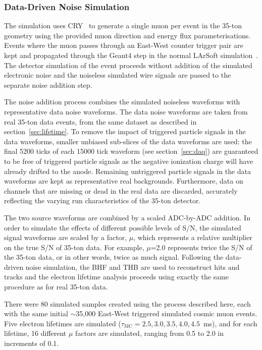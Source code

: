 \documentclass[10pt,a4paper]{article}
\begin{document}
\subsubsection{Data-Driven Noise Simulation}\label{sec:datadrivennoise}

The simulation uses CRY~\cite{CRY} to generate a single muon per event in the 35-ton geometry using the provided muon direction and energy flux parameterisations. Events where the muon passes through an East-West counter trigger pair are kept and propagated through the Geant4 step in the normal LArSoft simulation~\cite{larsoft}. The detector simulation of the event proceeds without addition of the simulated electronic noise and the noiseless simulated wire signals are passed to the separate noise addition step.

The noise addition process combines the simulated noiseless waveforms with representative data noise waveforms. The data noise waveforms are taken from real 35-ton data events, from the same dataset as described in section~\ref{sec:lifetime}. To remove the impact of triggered particle signals in the data waveforms, smaller unbiased sub-slices of the data waveforms are used: the final 5200 ticks of each 15000 tick waveform (see section~\ref{sec:daq}) are guaranteed to be free of triggered particle signals as the negative ionization charge will have already drifted to the anode. Remaining untriggered particle signals in the data waveforms are kept as representative real backgrounds. Furthermore, data on channels that are missing or dead in the real data are discarded, accurately reflecting the varying run characteristics of the 35-ton detector.

The two source waveforms are combined by a scaled ADC-by-ADC addition. In order to simulate the effects of different possible levels of S/N, the simulated signal waveforms are scaled by a factor, $\mu$, which represents a relative multiplier on the true S/N of 35-ton data. For example, $\mu$=2.0 represents twice the S/N of the 35-ton data, or in other words, twice as much signal. Following the data-driven noise simulation, the BHF and THB are used to reconstruct hits and tracks and the electron lifetime analysis proceeds using exactly the same procedure as for real 35-ton data.

There were 80 simulated samples created using the process described here, each with the same initial $\sim$35,000 East-West triggered simulated cosmic muon events. Five electron lifetimes are simulated ($\tau_{\text{MC}}=2.5,3.0,3.5,4.0,4.5$~ms), and for each lifetime, 16 different $\mu$ factors are simulated, ranging from 0.5 to 2.0 in increments of 0.1.
\end{document}
